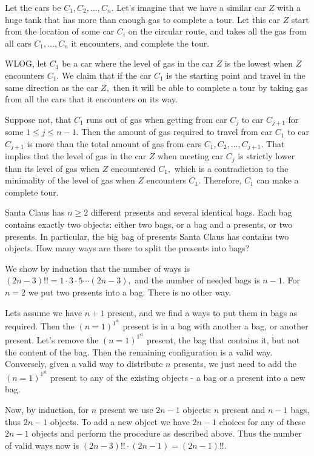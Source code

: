 \documentclass{article}
\begin{document}
\begin{soln}
    Let the cars be $C_1, C_2, \ldots, C_n.$ Let's imagine that we have a similar car $Z$ with a huge tank that has more than enough gas to complete a tour.
    Let this car $Z$ start from the location of some car $C_i$ on the circular route, and takes all the gas from all cars $C_1, \ldots , C_n$ it encounters,
    and complete the tour.
    
    WLOG, let $C_1$ be a car where the level of gas in the car $Z$ is the lowest when $Z$ encounters $C_1.$
    We claim that if the car $C_1$ is the starting point and travel in the same direction as the car $Z,$ then it will be able to
    complete a tour by taking gas from all the cars that it encounters on its way. 
    
    Suppose not, that $C_1$ runs out of gas when getting from car $C_j$ to car $C_{j+1}$ for some $1 \le j \le n - 1.$
    Then the amount of gas required to travel from car $C_1$ to car $C_{j+1}$ is more than the total amount of gas from cars $C_1, C_2, \ldots, C_{j+1}.$
    That implies that the level of gas in the car $Z$ when meeting car $C_j$ is strictly lower than its level of gas when $Z$ encountered $C_1,$
    which is a contradiction to the minimality of the level of gas when $Z$ encounters $C_1.$
    Therefore, $C_1$ can make a complete tour.
\end{soln}

\begin{problem}
    Santa Claus has $n \ge 2$ different presents and several identical bags. Each bag contains exactly two objects:
    either two bags, or a bag and a presents, or two presents. In particular, the big bag of presents Santa Claus has contains two objects.
    How many ways are there to split the presents into bags?
\end{problem}

\begin{soln}
    We show by induction that the number of ways is $(2n-3)!! = 1 \cdot 3 \cdot 5 \cdots (2n-3),$ and the number of needed bags is $n-1.$
    For $n=2$ we put two presents into a bag. There is no other way.

    Lets assume we have $n+1$ present, and we find a ways to put them in bags as required.
    Then the $(n=1)^{1^\text{st}}$ present is in a bag with another a bag, or another present.
    Let's remove the $(n=1)^{1^\text{st}}$ present, the bag that contains it, but not the content of the bag.
    Then the remaining configuration is a valid way.
    Conversely, given a valid way to distribute $n$ presents,
    we just need to add the $(n=1)^{1^\text{st}}$ present to any of the existing objects - a bag or a present into a new bag.

    Now, by induction, for $n$ present we use  $2n-1$ objects: $n$ present and $n-1$ bags, thus $2n-1$ objects.
    To add a new object we have $2n-1$ choices for any of these $2n-1$ objects and perform the procedure as described above.
    Thus the number of valid ways now is $(2n-3)!! \cdot (2n-1) = \boxed{(2n-1)!!.}$
\end{soln}
\end{document}
